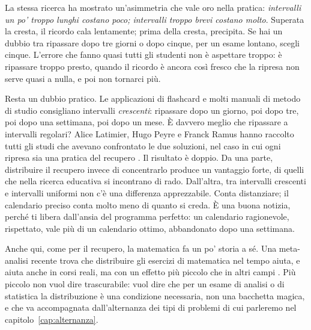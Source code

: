 La stessa ricerca ha mostrato un'asimmetria che vale oro nella pratica:
\emph{intervalli un po' troppo lunghi costano poco; intervalli troppo
brevi costano molto}. Superata la cresta, il ricordo cala lentamente;
prima della cresta, precipita. Se hai un dubbio tra ripassare dopo tre
giorni o dopo cinque, per un esame lontano, scegli cinque. L'errore che
fanno quasi tutti gli studenti non è aspettare troppo: è ripassare
troppo presto, quando il ricordo è ancora così fresco che la ripresa non
serve quasi a nulla, e poi non tornarci più.

Resta un dubbio pratico. Le applicazioni di flashcard e molti manuali
di metodo di studio consigliano intervalli \emph{crescenti}: ripassare
dopo un giorno, poi dopo tre, poi dopo una settimana, poi dopo un mese.
È davvero meglio che ripassare a intervalli regolari? Alice Latimier,
Hugo Peyre e Franck Ramus hanno raccolto tutti gli studi che avevano
confrontato le due soluzioni, nel caso in cui ogni ripresa sia una
pratica del recupero \parencite{latimier2021}. Il risultato è doppio.
Da una parte, distribuire il recupero invece di concentrarlo produce un
vantaggio forte, di quelli che nella ricerca educativa si incontrano di
rado. Dall'altra, tra intervalli crescenti e intervalli uniformi non
c'è una differenza apprezzabile. Conta distanziare; il calendario
preciso conta molto meno di quanto si creda. È una buona notizia,
perché ti libera dall'ansia del programma perfetto: un calendario
ragionevole, rispettato, vale più di un calendario ottimo, abbandonato
dopo una settimana.

Anche qui, come per il recupero, la matematica fa un po' storia a sé.
Una meta-analisi recente trova che distribuire gli esercizi di
matematica nel tempo aiuta, e aiuta anche in corsi reali, ma con un
effetto più piccolo che in altri campi \parencite{murray2025}. Più
piccolo non vuol dire trascurabile: vuol dire che per un esame di
analisi o di statistica la distribuzione è una condizione necessaria,
non una bacchetta magica, e che va accompagnata dall'alternanza dei
tipi di problemi di cui parleremo nel capitolo~\ref{cap:alternanza}.

